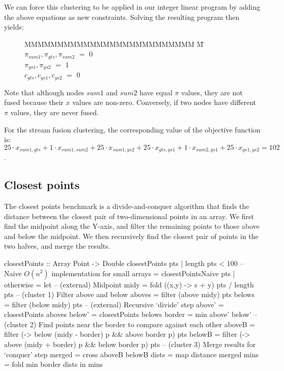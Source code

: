 We can force this clustering to be applied in our integer linear program by adding the above equations as new constraints.
Solving the resulting program then yields:

\begin{figure}[h!]
\begin{tabbing}
MMMMMMMMMMMMMMMMMMMMMMMMMM \= M \= \kill
$\pi_{sum1}, \pi_{gts }, \pi_{sum2}$
    \> $=$ \> $0$ \\
$\pi_{ys1 }, \pi_{ys2 }$
    \> $=$ \> $1$ \\
$c_{gts}, c_{ys1}, c_{ys2}$           
    \> $=$ \> $0$
\end{tabbing}
\end{figure}
Note that although nodes $sum1$ and $sum2$ have equal $\pi$ values, they are not fused because their $x$ values are non-zero.
Conversely, if two nodes have different $\pi$ values, they are never fused. 

For the stream fusion clustering, the corresponding value of the objective function is: \\
$25 \cdot x_{sum1, gts} + 1 \cdot x_{sum1,sum2} + 25 \cdot x_{sum1, ys2} + 25 \cdot x_{gts, ys1} + 1 \cdot x_{sum2, ys1} + 25 \cdot x_{ys1, ys2} = 102$. 


\subsection{Closest points}
The closest points benchmark is a divide-and-conquer algorithm that finds the distance between the closest pair of two-dimensional points in an array.
We first find the midpoint along the Y-axis, and filter the remaining points to those above and below the midpoint.
We then recursively find the closest pair of points in the two halves, and merge the results.

\begin{haskell}[float,caption=Closest points benchmark,label=figs:clustering:bench:closest-points]
closestPoints :: Array Point -> Double
closestPoints pts
 | length pts < 100
 -- Naive $O(n^2)$ implementation for small arrays
 = closestPointsNaive pts
 | otherwise
 = let -- (external) Midpoint
       midy    = fold (\s (x,y) -> s + y) pts / length pts
       -- (cluster 1) Filter above and below
       aboves  = filter (above midy) pts
       belows  = filter (below midy) pts
       -- (external) Recursive `divide' step
       above'  = closestPoints aboves
       below'  = closestPoints belows
       border  = min above' below'
       -- (cluster 2) Find points near the border to compare against each other
       aboveB  = filter (\p -> below (midy - border) p && above border p) pts
       belowB  = filter (\p -> above (midy + border) p && below border p) pts
       -- (cluster 3) Merge results for `conquer' step
       merged  = cross aboveB belowB
       dists   = map distance merged
       mins    = fold min border dists
   in  mins
\end{haskell}

